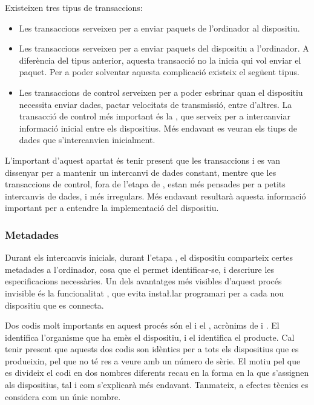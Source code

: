 Existeixen tres tipus de transaccions:
\begin{itemize}
    \item Les transaccions  serveixen per a enviar paquets de
    l'ordinador al dispositiu.
    \item Les transaccions  serveixen per a enviar paquets del
    dispositiu a l'ordinador. A diferència del tipus anterior, aquesta
    transacció no la inicia qui vol enviar el paquet. Per a poder
    solventar aquesta complicació existeix el següent tipus.
    \item Les transaccions de control serveixen per a poder esbrinar quan el
    dispositiu necessita enviar dades, pactar velocitats de transmissió, entre
    d'altres. La transacció de control més important és la ,
    que serveix per a intercanviar informació inicial entre els dispositius. Més
    endavant es veuran els tiups de dades que s'intercanvien inicialment.
\end{itemize}

L'important d'aquest apartat és tenir present que les transaccions  i
 es van dissenyar per a mantenir un intercanvi de dades constant,
mentre que les transaccions de control, fora de l'etapa de , estan
més pensades per a petits intercanvis de dades, i més irregulars. Més endavant
resultarà aquesta informació important per a entendre la implementació del
dispositiu.

\subsubsection*{Metadades}
\label{subsubsec:metadades}

Durant els intercanvis inicials, durant l'etapa , el dispositiu
comparteix certes metadades a l'ordinador, cosa que el permet identificar-se,
i descriure les especificacions necessàries. Un dels avantatges més visibles
d'aquest procés invisible és la funcionalitat , que evita
insta\l.lar programari per a cada nou dispositiu que es connecta.

Dos codis molt importants en aquest procés són el  i el ,
acrònims de  i . El  identifica
l'organisme que ha emès el dispositiu, i el  identifica el producte.
Cal tenir present que aquests dos codis son idèntics per a tots els dispositius
que es produeixin, pel que no té res a veure amb un número de sèrie. El motiu
pel que es divideix el codi en dos nombres diferents recau en la forma en la
que s'assignen als dispositius, tal i com s'explicarà més endavant. Tanmateix,
a efectes tècnics es considera com un únic nombre.


